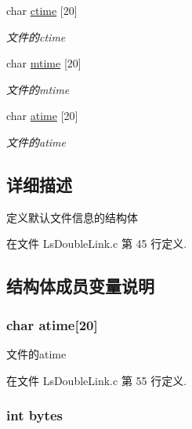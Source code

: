 \begin{DoxyCompactItemize}
char \hyperlink{struct_file_info_a607e3c2e52f5b3b02c357e8f42158f1a}{ctime} \mbox{[}20\mbox{]}
\begin{DoxyCompactList}\small\item\em 文件的ctime \end{DoxyCompactList}\item 
char \hyperlink{struct_file_info_a4849c44868992eec100647d14bd7e8d1}{mtime} \mbox{[}20\mbox{]}
\begin{DoxyCompactList}\small\item\em 文件的mtime \end{DoxyCompactList}\item 
char \hyperlink{struct_file_info_abbbadd548f448c75a5b4406189163167}{atime} \mbox{[}20\mbox{]}
\begin{DoxyCompactList}\small\item\em 文件的atime \end{DoxyCompactList}\end{DoxyCompactItemize}


\subsection{详细描述}
定义默认文件信息的结构体 

在文件 Ls\-Double\-Link.\-c 第 45 行定义.



\subsection{结构体成员变量说明}
\hypertarget{struct_file_info_abbbadd548f448c75a5b4406189163167}{
\subsubsection[{atime}]{\setlength{\rightskip}{0pt plus 5cm}char atime\mbox{[}20\mbox{]}}}\label{struct_file_info_abbbadd548f448c75a5b4406189163167}


文件的atime 



在文件 Ls\-Double\-Link.\-c 第 55 行定义.

\hypertarget{struct_file_info_a3e18e5ab1201e205ce88c473a2f4bf99}{
\subsubsection[{bytes}]{\setlength{\rightskip}{0pt plus 5cm}int bytes}}\label{struct_file_info_a3e18e5ab1201e205ce88c473a2f4bf99}


